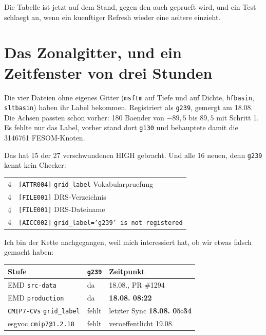 \documentclass[11pt,a4paper]{article}
\newcommand{\code}[1]{\texttt{\small #1}}
\begin{document}
Die Tabelle ist jetzt auf dem Stand, gegen den auch geprueft wird, und ein Test
schlaegt an, wenn ein kuenftiger Refresh wieder eine aeltere einzieht.

\section{Das Zonalgitter, und ein Zeitfenster von drei Stunden}

Die vier Dateien ohne eigenes Gitter (\code{msftm} auf Tiefe und auf Dichte,
\code{hfbasin}, \code{sltbasin}) haben ihr Label bekommen. Registriert als
\code{g239}, gemergt am 18.08. Die Achsen passten schon vorher: 180 Baender von
$-89{,}5$ bis $89{,}5$ mit Schritt 1. Es fehlte nur das Label, vorher stand dort
\code{g130} und behauptete damit die 3146761 FESOM-Knoten.

Das hat 15 der 27 verschwundenen HIGH gebracht. Und alle 16 neuen, denn
\code{g239} kennt kein Checker:

\begin{center}
\begin{tabular}{rl}
\toprule
4 & \code{[ATTR004]} \code{grid\_label} Vokabularpruefung \\
4 & \code{[FILE001]} DRS-Verzeichnis \\
4 & \code{[FILE001]} DRS-Dateiname \\
4 & \code{[AICC002]} \code{grid\_label='g239' is not registered} \\
\bottomrule
\end{tabular}
\end{center}

Ich bin der Kette nachgegangen, weil mich interessiert hat, ob wir etwas falsch
gemacht haben:

\begin{center}
\begin{tabular}{lll}
\toprule
\textbf{Stufe} & \textbf{\code{g239}} & \textbf{Zeitpunkt} \\
\midrule
EMD \code{src-data}                & da      & 18.08., PR \#1294 \\
EMD \code{production}              & da      & \textbf{18.08. 08:22} \\
\code{CMIP7-CVs} \code{grid\_label} & fehlt   & letzter Sync \textbf{18.08. 05:34} \\
esgvoc \code{cmip7@1.2.18}          & fehlt   & veroeffentlicht 19.08. \\
\bottomrule
\end{tabular}
\end{center}
\end{document}
